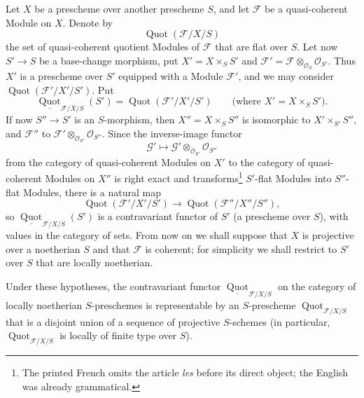 Let $X$ be a prescheme over another prescheme $S$, and let $\mathcal F$ be a
quasi-coherent Module on $X$. Denote by
\[
\operatorname{Quot}(\mathcal F/X/S)
\]
the set of quasi-coherent quotient Modules of $\mathcal F$ that are flat over
$S$. Let now $S'\longrightarrow S$ be a base-change morphism, put
$X'=X\times_S S'$ and
$\mathcal F'=\mathcal F\otimes_{\mathcal O_S}\mathcal O_{S'}$. Thus $X'$ is
a prescheme over $S'$ equipped with a Module
$\mathcal F'$, and we may consider
$\operatorname{Quot}(\mathcal F'/X'/S')$. Put
\[
\underline{\operatorname{Quot}}_{\mathcal F/X/S}(S')
=\operatorname{Quot}(\mathcal F'/X'/S')
\qquad\text{(where $X'=X\times_SS'$)}.
\]
If now $S''\longrightarrow S'$ is an $S$-morphism, then
$X''=X\times_SS''$ is isomorphic to $X'\times_{S'}S''$, and $\mathcal F''$ to
$\mathcal F'\otimes_{\mathcal O_{S'}}\mathcal O_{S''}$. Since the inverse-image
functor
\[
\mathcal G'\longmapsto
\mathcal G'\otimes_{\mathcal O_{S'}}\mathcal O_{S''}
\]
from the category of quasi-coherent Modules on $X'$ to the category of
quasi-coherent Modules on $X''$ is right exact and transforms\footnote{The printed French omits the article \emph{les} before its direct object; the English was already grammatical.} $S'$-flat
Modules into $S''$-flat Modules, there is a natural map
\[
\operatorname{Quot}(\mathcal F'/X'/S')\longrightarrow
\operatorname{Quot}(\mathcal F''/X''/S''),
\]
so $\underline{\operatorname{Quot}}_{\mathcal F/X/S}(S')$ is a contravariant
functor of $S'$ (a prescheme over $S$), with values in the category of sets.
From now on we shall suppose that $X$ is projective over a noetherian $S$ and
that $\mathcal F$ is coherent; for simplicity we shall restrict to $S'$ over
$S$ that are locally noetherian.

 Under these hypotheses, the contravariant functor
$\underline{\operatorname{Quot}}_{\mathcal F/X/S}$ on the category of locally
noetherian $S$-preschemes is representable by an $S$-prescheme
$\operatorname{Quot}_{\mathcal F/X/S}$ that is a disjoint union of a sequence
of projective $S$-schemes (in particular,
$\operatorname{Quot}_{\mathcal F/X/S}$ is locally of finite type over $S$).

